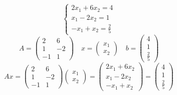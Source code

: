 \documentclass[a4paper]{article}
\theoremstyle{break}
\theoremstyle{break}
\theoremstyle{break}
\theoremstyle{break}
\begin{document}
\begin{figure}[H]
  \begin{example}
    \[
      \begin{cases}
        2x_1 + 6x_2 = 4\\
        x_1 - 2x_2 = 1\\
        -x_1 + x_2 = \frac{2}{5}
      \end{cases}
    \] 
    \[
      A = 
      \begin{pmatrix} 
        2 & 6 \\
        1 & -2 \\
        -1 & 1
      \end{pmatrix} 
      \quad
      x = \begin{pmatrix} 
        x_1\\
        x_2
      \end{pmatrix} 
      \quad
      b = \begin{pmatrix} 
        4\\
        1\\
        \frac{2}{5}
      \end{pmatrix} 
    \] 
    \[
      Ax = \begin{pmatrix} 
        2 & 6\\
        1 & -2\\
        -1 & 1
      \end{pmatrix} 
      \begin{pmatrix} 
        x_1\\
        x_2
      \end{pmatrix} 
      =
      \begin{pmatrix} 
        2x_1 + 6x_2\\
        x_1 - 2x_2\\
        -x_1 + x_2
      \end{pmatrix}
      =
      \begin{pmatrix} 
        4\\
        1\\
        \frac{2}{5}
      \end{pmatrix} 
    \] 
  \end{example}
\end{figure}
\end{document}
